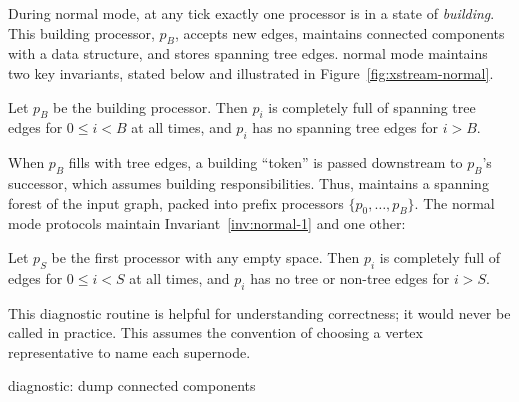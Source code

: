 
During \XSCC normal mode, at any \XStream tick exactly one
processor is in a state of \emph{building}.
This building processor, $p_B$, accepts new edges, maintains connected
components with a \uf data structure, and stores spanning tree edges.
\XSCC normal mode maintains two key invariants, stated below and
illustrated in Figure~\ref{fig:xstream-normal}.
\begin{invariant}
Let $p_B$ be the building processor.  Then $p_i$ is completely full of
spanning tree edges for $0 \le i < B$ at all times, and $p_i$ has no
spanning tree edges for $i > B$. \label{inv:normal-1}
\end{invariant}

When $p_B$ fills with tree edges, a building ``token'' is passed downstream
to $p_B$'s successor, which assumes building responsibilities.  Thus, \XSCC
maintains a spanning forest of the input graph, packed into prefix processors
$\{p_0, \ldots, p_B\}$.
The \XSCC normal mode protocols maintain Invariant~\ref{inv:normal-1} and one other:

\begin{invariant}
Let $p_S$ be the first processor with any empty space.  Then $p_i$ is
completely full of edges for $0 \le i < S$ at all times, and $p_i$ has no
tree or non-tree edges for $i > S$. \label{inv:normal-2}
\end{invariant}


\setcounter{algorithm}{0}  %
\begin{algorithm*}
\caption{This diagnostic routine is helpful for understanding correctness;
it would never be called in practice.  \label{algo:dump} 
This assumes the \WStream convention of choosing a vertex representative to name each 
supernode.
}
\XSCC diagnostic: dump connected components \\
\makealgtitle
\begin{algorithmic}[1]
          \label{lab:startRelabel}
\State        {}\label{lab:endRelabel}
          \EndWhile
{}
             \label{lab:startUFdump}
\State        {} \label{lab:endUFdump}
          \EndFor
\EndProcedure
\end{algorithmic}
\end{algorithm*}

